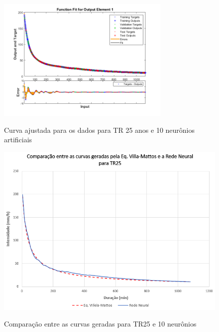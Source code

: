 \begin{figure}[H]
    \caption{Curva ajustada para os dados para TR 25 anos e 10 neurônios artificiais}
    \centering
    \includegraphics[width=0.74\textwidth]{Textuais/Figuras/NN/tr25-10neuronio.png}
    \label{fig:tr25-10n}
\end{figure}

\begin{figure}[H]
    \caption{Comparação entre as curvas geradas para TR25 e 10 neurônios}
    \centering
    \includegraphics[width=\textwidth]{Textuais/Resultados/Comparacao/TR25.png}
    \label{fig:comp-tr25}
\end{figure}